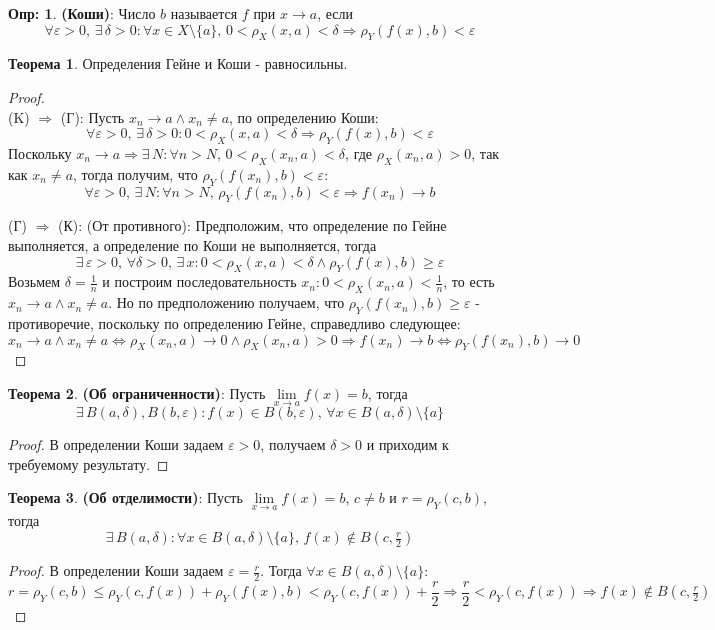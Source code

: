 \documentclass[12pt]{article}
\newcommand{\VE}{\varepsilon}
\theoremstyle{definition}
\newtheorem{defn}{Опр:}
\newtheorem{theorem}{Теорема}
\begin{document}
\begin{defn}
	\textbf{(Коши)}: Число $b$ называется  $f$ при $x \to a$, если
	$$
		\forall \VE>0, \, \exists\, \delta > 0 \colon \forall x \in X \setminus \{a\},\, 0 < \rho_X(x,a) < \delta \Rightarrow \rho_Y(f(x), b) < \VE
	$$
\end{defn}
\begin{theorem}
	Определения Гейне и Коши - равносильны.
\end{theorem}
\begin{proof}\hfill\\
	(K) $\Rightarrow$ (Г): Пусть $x_n \to a \wedge x_n \neq a$, по определению Коши:
	$$
		\forall \VE>0, \, \exists\, \delta > 0 \colon 0 < \rho_X(x,a) < \delta \Rightarrow \rho_Y(f(x), b) < \VE
	$$
	Поскольку $x_n \to a \Rightarrow \exists \, N \colon \forall n > N, \, 0 <\rho_X(x_n,a) < \delta$, где $\rho_X(x_n,a) > 0$, так как $x_n \neq a$, тогда получим, что  $\rho_Y(f(x_n),b) < \VE$:
	$$
		\forall \VE > 0, \, \exists \, N \colon \forall n> N , \, \rho_Y(f(x_n),b) < \VE \Rightarrow f(x_n) \to b
	$$
	
	(Г) $\Rightarrow$ (К): (От противного): Предположим, что определение по Гейне выполняется, а определение по Коши не выполняется, тогда 
	$$
		\exists \, \VE > 0, \, \forall \delta > 0,\, \exists \, x \colon 0 < \rho_X(x,a) < \delta \wedge \rho_Y(f(x),b) \geq \VE
	$$ 
	Возьмем $\delta = \tfrac{1}{n}$ и построим последовательность $x_n \colon 0 < \rho_X(x_n,a) < \tfrac{1}{n}$, то есть $x_n \to a \wedge x_n \neq a$. Но по предположению получаем, что $\rho_Y(f(x_n), b) \geq \VE$ - противоречие, поскольку по определению Гейне, справедливо следующее: 
	$$
		x_n \to a\wedge x_n \neq a \Leftrightarrow \rho_X(x_n,a) \to 0 \wedge \rho_X(x_n,a) > 0\Rightarrow f(x_n) \to b \Leftrightarrow \rho_Y(f(x_n),b) \to 0
	$$
\end{proof}
\begin{theorem}
	\textbf{(Об ограниченности)}: Пусть  $\lim\limits_{x \to a}f(x) = b$, тогда 
	$$
		\exists\, B(a,\delta), B(b,\VE) \colon f(x) \in B(b,\VE), \, \forall x \in B(a,\delta)\setminus \{a\}
	$$
\end{theorem}
\begin{proof}
	В определении Коши задаем $\VE > 0$, получаем $\delta >0$ и приходим к требуемому результату.
\end{proof}

\begin{theorem}
	\textbf{(Об отделимости)}: Пусть  $\lim\limits_{x \to a}f(x) = b$, $c \neq b$ и $r = \rho_Y(c,b)$, тогда 
	$$
		\exists\, B(a,\delta) \colon \forall x \in B(a,\delta)\setminus \{a\}, \, f(x) \notin B(c,\tfrac{r}{2})
	$$
\end{theorem}
\begin{proof}
	В определении Коши задаем $\VE = \tfrac{r}{2}$. Тогда $\forall x \in B(a,\delta)\setminus \{a\}$:
	$$
		r = \rho_Y(c,b) \leq \rho_Y(c,f(x)) + \rho_Y(f(x),b) < \rho_Y(c,f(x)) + \dfrac{r}{2} \Rightarrow \dfrac{r}{2} < \rho_Y(c,f(x)) \Rightarrow f(x) \notin B(c,\tfrac{r}{2})
	$$
\end{proof}
\end{document}
